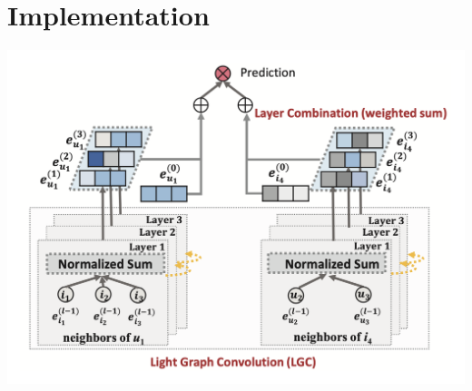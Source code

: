 \section{Implementation}

\begin{minipage}{\linewidth}
    \centering%
    \includegraphics[scale=0.28]{assets/lgc_architecture.png}%
    \label{fig:impl:lgc_arch}%
\end{minipage}